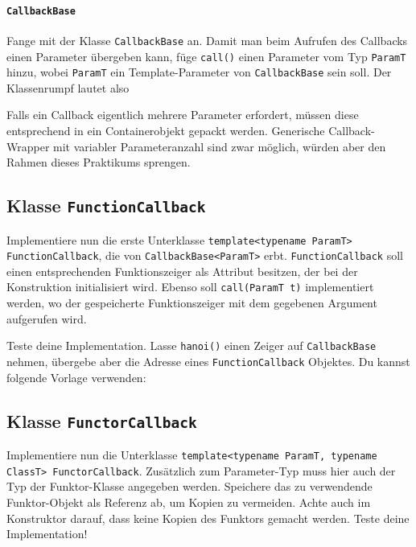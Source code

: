 \paragraph*{\lstinline{CallbackBase}}

Fange mit der Klasse \lstinline{CallbackBase} an.
Damit man beim Aufrufen des Callbacks einen Parameter übergeben kann, füge \lstinline{call()} einen Parameter vom Typ \lstinline{ParamT} hinzu, wobei \lstinline{ParamT} ein Template-Parameter von \lstinline{CallbackBase} sein soll.
Der Klassenrumpf lautet also



Falls ein Callback eigentlich mehrere Parameter erfordert, müssen diese entsprechend in ein Containerobjekt gepackt werden.
Generische Callback-Wrapper mit variabler Parameteranzahl sind zwar möglich, würden aber den Rahmen dieses Praktikums sprengen.


\subsection{Klasse \lstinline{FunctionCallback}}
Implementiere nun die erste Unterklasse \lstinline{template<typename ParamT> FunctionCallback}, die von \lstinline{CallbackBase<ParamT>} erbt.
\lstinline{FunctionCallback} soll einen entsprechenden Funktionszeiger als Attribut besitzen, der bei der Konstruktion initialisiert wird.
Ebenso soll \lstinline{call(ParamT t)} implementiert werden, wo der gespeicherte Funktionszeiger mit dem gegebenen Argument aufgerufen wird.

Teste deine Implementation.
Lasse \lstinline{hanoi()} einen Zeiger auf \lstinline{CallbackBase} nehmen, übergebe aber die Adresse eines \lstinline{FunctionCallback} Objektes.
Du kannst folgende Vorlage verwenden:




\subsection{Klasse \lstinline{FunctorCallback}}
Implementiere nun die Unterklasse \lstinline{template<typename ParamT, typename ClassT> FunctorCallback}.
Zusätzlich zum Parameter-Typ muss hier auch der Typ der Funktor-Klasse angegeben werden.
Speichere das zu verwendende Funktor-Objekt als Referenz ab, um Kopien zu vermeiden.
Achte auch im Konstruktor darauf, dass keine Kopien des Funktors gemacht werden.
Teste deine Implementation!



